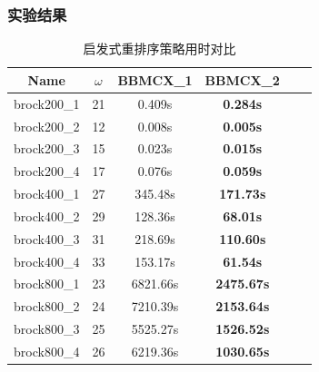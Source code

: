 \documentclass[slidestop,compress,mathserif]{beamer}
\begin{document}
	\begin{frame}
\frametitle {实验结果}
\vspace{1em}
	\begin{adjustwidth}{-2em}{-2em}
		\begin{table}[H]
	\begin{center}
		\begin{tabular}{c|c|c|c|c|c}
			\textbf{Name} & $\omega$ & \textbf{BBMCX\_1} & \textbf{BBMCX\_2}\\
			\hline
brock200\_1 & 21 & 0.409s & \textbf{0.284s} \\
brock200\_2 & 12 & 0.008s & \textbf{0.005s} \\
brock200\_3 & 15 & 0.023s & \textbf{0.015s} \\
brock200\_4 & 17 & 0.076s & \textbf{0.059s} \\
brock400\_1 & 27 & 345.48s & \textbf{171.73s} \\
brock400\_2 & 29 & 128.36s & \textbf{68.01s} \\
brock400\_3 & 31 & 218.69s & \textbf{110.60s} \\
brock400\_4 & 33 & 153.17s & \textbf{61.54s} \\
brock800\_1 & 23 & 6821.66s & \textbf{2475.67s} \\
brock800\_2 & 24 & 7210.39s & \textbf{2153.64s} \\
brock800\_3 & 25 & 5525.27s & \textbf{1526.52s} \\
brock800\_4 & 26 & 6219.36s & \textbf{1030.65s}
		\end{tabular}
		\caption{启发式重排序策略用时对比}
	\end{center}
		\end{table}
	\end{adjustwidth}
	\end{frame}
\end{document}
